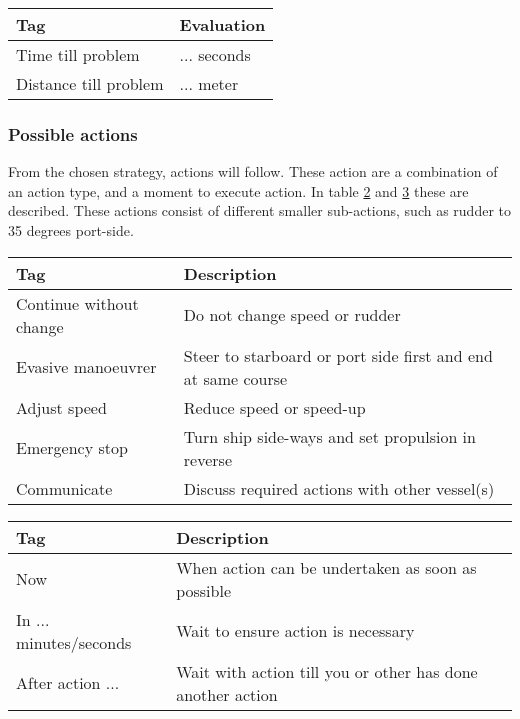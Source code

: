 \begin{table}[H]
	\begin{tabular}{p{}|p{}}
		\toprule
		Tag & Evaluation \\
		\midrule
		Time till problem & ... seconds\\
		Distance till problem & ... meter \\
		\bottomrule
	\end{tabular}
	
	\label{tab:manouvre-criteria}
\end{table}

\subsubsection{Possible actions}
From the chosen strategy, actions will follow. These action are a combination of an action type, and a moment to execute action. In table \ref{tab:actions} and \ref{tab:time-domain-action} these are described. These actions consist of different smaller sub-actions, such as rudder to 35 degrees port-side. 
\begin{table}[H]
	\begin{tabular}{p{}|p{}}
		\toprule
		Tag & Description\\
		\midrule
		Continue without change & Do not change speed or rudder\\
		Evasive manoeuvrer & Steer to starboard or port side first and end at same course\\
		Adjust speed & Reduce speed or speed-up \\
		Emergency stop & Turn ship side-ways and set propulsion in reverse\\
		Communicate & Discuss required actions with other vessel(s)\\
		\bottomrule
	\end{tabular}
	
	\label{tab:actions}
\end{table}

\begin{table}[H]
	\begin{tabular}{p{}|p{}}
		\toprule
		Tag & Description\\
		\midrule
		Now & When action can be undertaken as soon as possible \\
		In ... minutes/seconds & Wait to ensure action is necessary \\
		After action ... & Wait with action till you or other has done another action \\
		\bottomrule
	\end{tabular}
	
	\label{tab:time-domain-action}
\end{table}

